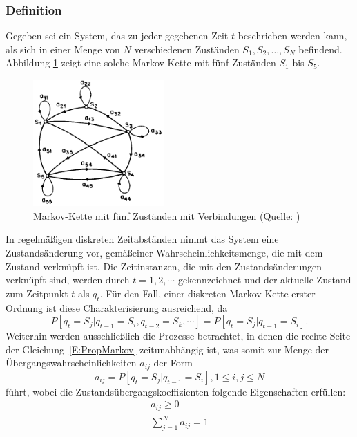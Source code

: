 \subsubsection{Definition}
Gegeben sei ein System, das zu jeder gegebenen Zeit $t$ beschrieben werden kann, als sich in einer Menge von $N$ verschiedenen Zust\"anden
$S_1, S_2, \ldots, S_N$ befindend. Abbildung \ref{fig:MarkovKette} zeigt eine solche Markov-Kette mit f\"unf Zust\"anden $S_1$ bis $S_5$.
\begin{figure}[htb]
\centering
\includegraphics[width=5cm]{img/markov/markov_chain.png}
\caption[Markov-Kette mit f\"unf Zust\"anden]{Markov-Kette mit f\"unf Zust\"anden  mit Verbindungen (Quelle: )}
\label{fig:MarkovKette}
\end{figure}
In regelm\"a\ss igen diskreten Zeitabst\"anden nimmt das System eine Zustands\"anderung vor, gem\"a\ss einer Wahrscheinlichkeitsmenge, die mit dem Zustand verkn\"upft ist. Die Zeitinstanzen, die mit den Zustands\"anderungen verkn\"upft sind, werden durch $t = 1, 2, \cdots$ gekennzeichnet und der aktuelle Zustand zum Zeitpunkt $t$ als $q_t$. F\"ur den Fall, einer diskreten Markov-Kette erster Ordnung ist diese Charakterisierung ausreichend, da
\begin{equation}
\label{E:PropMarkov}
P[q_t = S_j | q_{t-1} = S_i, q_{t-2} = S_k, \cdots]= P[q_t = S_j | q_{t-1} = S_i].
\end{equation}
Weiterhin werden ausschlie\ss lich die Prozesse betrachtet, in denen die rechte Seite der Gleichung~\ref{E:PropMarkov} zeitunabh\"angig ist, was somit zur Menge der \"Ubergangswahrscheinlichkeiten $a_{ij}$ der Form
\begin{equation}
\label{E:PropTrans}
a_{ij} = P[q_t = S_j | q_{t-1} = S_i], 1 \leq i, j \leq N
\end{equation}
f\"uhrt, wobei die Zustands\"ubergangskoeffizienten folgende Eigenschaften erf\"ullen:
\begin{subequations}
\begin{eqnarray}
\label{E:MarkovProperties}
a_{ij} \geq 0 \label{E:MarkovProperties1}\\
\sum_{j = 1}^{N} a_{ij} = 1 \label{E:MarkovProperties2}
\end{eqnarray}
\end{subequations}
